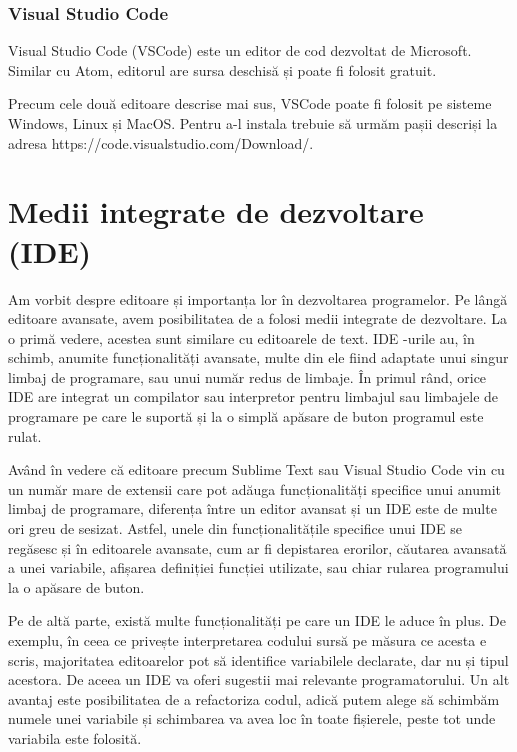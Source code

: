\subsubsection{Visual Studio Code}
\label{sec:appdev-graphicedit-vsc}

Visual Studio Code (VSCode) este un editor de cod dezvoltat de Microsoft.
Similar cu Atom, editorul are sursa deschisă și poate fi folosit gratuit.

Precum cele două editoare descrise mai sus, VSCode poate fi folosit pe sisteme
Windows, Linux și MacOS. Pentru a-l instala trebuie să urmăm pașii descriși la
adresa https://code.visualstudio.com/Download/.

\section{Medii integrate de dezvoltare (IDE)}
\label{sec:appdev-ide}

Am vorbit despre editoare și importanța lor în dezvoltarea programelor. Pe lângă
editoare avansate, avem posibilitatea de a folosi medii integrate de dezvoltare.
La o primă vedere, acestea sunt similare cu editoarele de text. IDE
-urile au, în schimb, anumite
funcționalități avansate, multe din ele fiind adaptate unui singur limbaj de
programare, sau unui număr redus de limbaje. În primul rând, orice IDE are
integrat un compilator sau interpretor pentru limbajul sau limbajele de
programare pe care le suportă și la o simplă apăsare de buton programul este
rulat.

Având în vedere că editoare precum Sublime Text sau Visual Studio Code vin cu un
număr mare de extensii care pot adăuga funcționalități specifice unui anumit
limbaj de programare, diferența între un editor avansat și un IDE este de multe
ori greu de sesizat. Astfel, unele din funcționalitățile specifice unui IDE se
regăsesc și în editoarele avansate, cum ar fi depistarea erorilor, căutarea
avansată a unei variabile, afișarea definiției funcției utilizate, sau chiar
rularea programului la o apăsare de buton.

Pe de altă parte, există multe funcționalități pe care un IDE le aduce în plus.
De exemplu, în ceea ce privește interpretarea codului sursă pe măsura ce acesta
e scris, majoritatea editoarelor pot să identifice variabilele declarate, dar nu
și tipul acestora. De aceea un IDE va oferi sugestii mai relevante
programatorului. Un alt avantaj este posibilitatea de a refactoriza codul, adică
putem alege să schimbăm numele unei variabile și schimbarea va avea loc în toate
fișierele, peste tot unde variabila este folosită.

